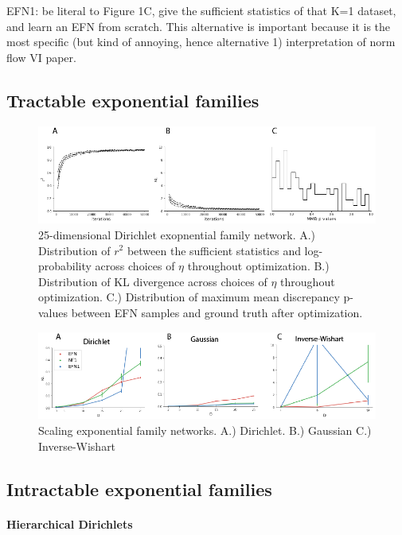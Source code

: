 \documentclass{article}
\begin{document}
EFN1:  be literal to Figure 1C, give the sufficient statistics of that K=1 dataset, and learn an EFN from scratch.  This alternative is important because it is the most specific (but kind of annoying, hence alternative 1) interpretation of norm flow VI paper.  

\subsection{Tractable exponential families}

 \begin{figure}
  \centering
\includegraphics[scale=0.4]{figs/fig2/fig2.png}
  \caption{25-dimensional Dirichlet exopnential family network.  A.) Distribution of $r^2$ between the sufficient statistics and log-probability across choices of $\eta$ throughout optimization.  B.) Distribution of KL divergence across choices of $\eta$ throughout optimization.  C.) Distribution of maximum mean discrepancy p-values between EFN samples and ground truth after optimization.}
\end{figure}

 \begin{figure}
  \centering
\includegraphics[scale=0.4]{figs/fig3/fig3.png}
  \caption{Scaling exponential family networks.  A.) Dirichlet.  B.) Gaussian  C.) Inverse-Wishart}
\end{figure}

\subsection{Intractable exponential families}


\paragraph{Hierarchical Dirichlets}
\end{document}
